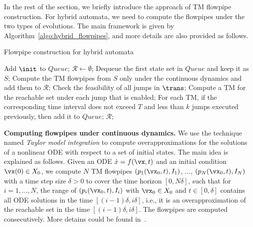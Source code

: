 In the rest of the section, we briefly introduce the approach of TM flowpipe construction. For hybrid automata, we need to compute the flowpipes under the two types of evolutions. The main framework is given by Algorithm~\ref{algo:hybrid_flowpipes}, and more details are also provided as follows.


\begin{algorithm}
 \caption{Flowpipe construction for hybrid automata}\label{algo:hybrid_flowpipes}
 \begin{algorithmic}[1]
  \STATE Add $\init$ to $\textit{Queue}$;
  \STATE $\mathcal{R} \leftarrow \emptyset$;
   \STATE Dequeue the first state set in $\textit{Queue}$ and keep it as $S$;
   \STATE Compute the TM flowpipes from $S$ only under the continuous dynamics and add them to $\mathcal{R}$;
   \STATE Check the feasibility of all jumps in $\trans$;
   \STATE Compute a TM for the reachable set under each jump that is enabled;
   \STATE For each TM, if the corresponding time interval does not exceed $T$ and less than $k$ jumps executed previously, then add it to $\textit{Queue}$;
  \ENDWHILE
  \RETURN $\mathcal{R}$;
 \end{algorithmic}
\end{algorithm}


\noindent\textbf{Computing flowpipes under continuous dynamics.}
We use the technique named \emph{Taylor model integration} to compute overapproximations for the solutions of a nonlinear ODE with respect to a set of initial states. The main idea is explained as follows. Given an ODE $\dot{x} = f(\vx,t)$ and an initial condition $\vx(0) \in X_0$, we compute $N$ TM flowpipes $(p_1(\vx_0,t), I_1)$, $\dots$, $(p_N(\vx_0,t), I_N)$ with a time step size $\delta > 0$ to cover the time horizon $[0,N\delta]$, such that for $i=1,\dots,N$, the range of $(p_i(\vx_0,t), I_i)$ with $\vx_0\in X_0$ and $t\in [0,\delta]$ contains all ODE solutions in the time $[(i-1)\delta, i\delta]$, i.e., it is an overapproximation of the reachable set in the time $[(i-1)\delta, i\delta]$. The flowpipes are computed consecutively. More detains could be found in~\cite{Berz+Makino/1998/Verified, Chen/2015/phd}.

